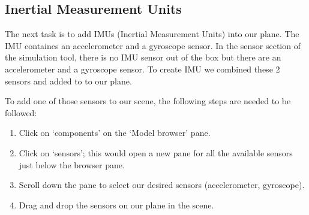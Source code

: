 \subsection{Inertial Measurement Units}

The next task is to add IMUs (Inertial Measurement Units) into our plane. The IMU containes an accelerometer and a gyroscope sensor. In the sensor section of the simulation tool, there is no IMU sensor out of the box but there are an accelerometer and a gyroscope sensor. To create IMU we combined these 2 sensors and added to to our plane. 

To add one of those sensors to our scene, the following steps are needed to be followed:

\begin{enumerate}
  \item Click on ‘components’ on the ‘Model browser’ pane.
  \item Click on ‘sensors’; this would open a new pane for all the available sensors just below the browser pane.
  \item Scroll down the pane to select our desired sensors (accelerometer, gyroscope).
  \item Drag and drop the sensors on our plane in the scene.
\end{enumerate}


